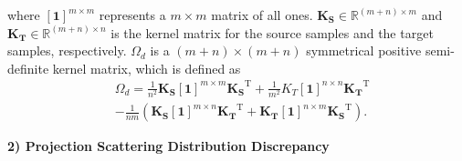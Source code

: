 \documentclass[a4paper]{cas-sc}
\begin{document}
where $\boldsymbol{[1]}^{m \times m}$ represents a $m \times m$ matrix of all ones. $\boldsymbol{K_S}\in \mathbb{R}^{(m+n) \times m}$ and $\boldsymbol{K_T}\in \mathbb{R}^{(m+n) \times n}$ is the kernel matrix for the source samples and the target samples, respectively. $\Omega_d$ is a
$(m + n) \times (m + n)$ symmetrical positive semi-definite kernel matrix, which is defined as
\begin{equation}
\begin{aligned}
&\Omega_d = \frac{1}{n^{2}} \boldsymbol{K_{{S}}}\boldsymbol{[1]}^{m \times m} \boldsymbol{K_{S}}^{\mathrm{T}}+\frac{1}{m^{2}} K_{{T}}\boldsymbol{[1]}^{n \times n} \boldsymbol{K_{T}}^{\mathrm{T}} \\
& -\frac{1}{n m}\left(\boldsymbol{K_{{S}}}\boldsymbol{[1]}^{m \times n} \boldsymbol{K_{{T}}}^{\mathrm{T}}+\boldsymbol{K_{{T}}}\boldsymbol{[1]}^{n \times m} \boldsymbol{K_{{S}}}^{\mathrm{T}}\right).
\end{aligned}
\end{equation}


\textbf{2) Projection Scattering Distribution Discrepancy}
\end{document}
